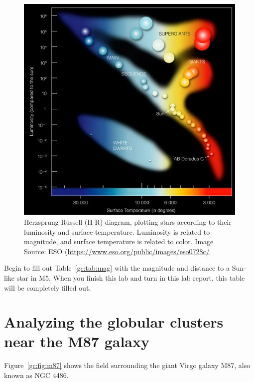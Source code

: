 \begin{figure}
	\includegraphics[width=\textwidth]{globular-cluster/eso0728c}
	\caption{Herzsprung-Russell (H-R) diagram, plotting stars according to their luminosity and surface temperature. Luminosity is related to magnitude, and surface temperature is related to color. Image Source: ESO (\url{https://www.eso.org/public/images/eso0728c/}}\label{gc:fig:hr}
\end{figure}

\begin{steps}
	\item Begin to fill out Table~\ref{gc:tab:mag} with the magnitude and distance to a Sun-like star
	in M5. When you finish this lab and turn in this lab report, this table will
	be completely filled out.
\end{steps}

\section{Analyzing the globular clusters near the M87 galaxy}

Figure~\ref{gc:fig:m87} shows the field surrounding the giant Virgo galaxy M87, also known as NGC 4486.

